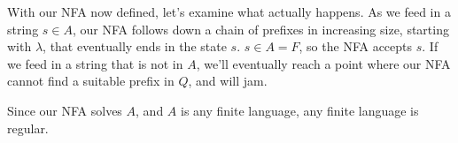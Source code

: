 \documentclass[11pt]{article}
\begin{document}
With our NFA now defined, let's examine what actually happens. As we feed in a string $s \in A$, our NFA follows down a chain of prefixes in increasing size, starting with $\lambda$, that eventually ends in the state $s$. $s \in A = F$, so the NFA accepts $s$. If we feed in a string that is not in $A$, we'll eventually reach a point where our NFA cannot find a suitable prefix in $Q$, and will jam.

Since our NFA solves $A$, and $A$ is any finite language, any finite language is regular.
\end{document}
